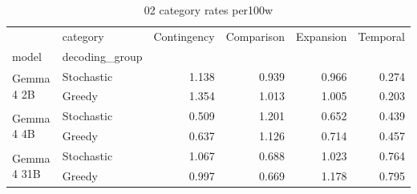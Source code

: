 \begin{table}
\caption{02 category rates per100w}
\begin{tabular}{llrrrr}
\toprule
 & category & Contingency & Comparison & Expansion & Temporal \\
model & decoding_group &  &  &  &  \\
\midrule
\multirow[t]{2}{*}{Gemma 4 2B} & Stochastic & 1.138 & 0.939 & 0.966 & 0.274 \\
 & Greedy & 1.354 & 1.013 & 1.005 & 0.203 \\
\cline{1-6}
\multirow[t]{2}{*}{Gemma 4 4B} & Stochastic & 0.509 & 1.201 & 0.652 & 0.439 \\
 & Greedy & 0.637 & 1.126 & 0.714 & 0.457 \\
\cline{1-6}
\multirow[t]{2}{*}{Gemma 4 31B} & Stochastic & 1.067 & 0.688 & 1.023 & 0.764 \\
 & Greedy & 0.997 & 0.669 & 1.178 & 0.795 \\
\cline{1-6}
\bottomrule
\end{tabular}
\end{table}
